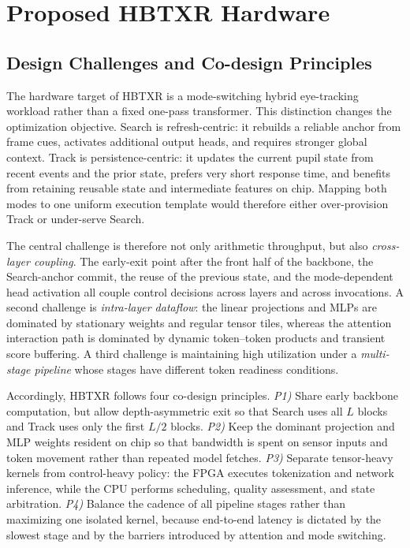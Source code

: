 \documentclass[journal]{IEEEtran}
\begin{document}
\section{Proposed HBTXR Hardware}
\subsection{Design Challenges and Co-design Principles}
The hardware target of HBTXR is a mode-switching hybrid eye-tracking workload rather than a fixed one-pass transformer. This distinction changes the optimization objective. Search is refresh-centric: it rebuilds a reliable anchor from frame cues, activates additional output heads, and requires stronger global context. Track is persistence-centric: it updates the current pupil state from recent events and the prior state, prefers very short response time, and benefits from retaining reusable state and intermediate features on chip. Mapping both modes to one uniform execution template would therefore either over-provision Track or under-serve Search.

The central challenge is therefore not only arithmetic throughput, but also \emph{cross-layer coupling}. The early-exit point after the front half of the backbone, the Search-anchor commit, the reuse of the previous state, and the mode-dependent head activation all couple control decisions across layers and across invocations. A second challenge is \emph{intra-layer dataflow}: the linear projections and MLPs are dominated by stationary weights and regular tensor tiles, whereas the attention interaction path is dominated by dynamic token--token products and transient score buffering. A third challenge is maintaining high utilization under a \emph{multi-stage pipeline} whose stages have different token readiness conditions.

Accordingly, HBTXR follows four co-design principles. \emph{P1)} Share early backbone computation, but allow depth-asymmetric exit so that Search uses all $L$ blocks and Track uses only the first $L/2$ blocks. \emph{P2)} Keep the dominant projection and MLP weights resident on chip so that bandwidth is spent on sensor inputs and token movement rather than repeated model fetches. \emph{P3)} Separate tensor-heavy kernels from control-heavy policy: the FPGA executes tokenization and network inference, while the CPU performs scheduling, quality assessment, and state arbitration. \emph{P4)} Balance the cadence of all pipeline stages rather than maximizing one isolated kernel, because end-to-end latency is dictated by the slowest stage and by the barriers introduced by attention and mode switching.
\end{document}
